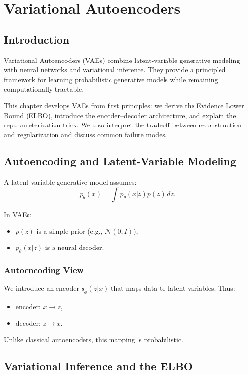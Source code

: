 \chapter{Variational Autoencoders}

\section{Introduction}

Variational Autoencoders (VAEs) combine latent-variable generative modeling with neural networks and variational inference. They provide a principled framework for learning probabilistic generative models while remaining computationally tractable.

This chapter develops VAEs from first principles: we derive the Evidence Lower Bound (ELBO), introduce the encoder--decoder architecture, and explain the reparameterization trick. We also interpret the tradeoff between reconstruction and regularization and discuss common failure modes.

\section{Autoencoding and Latent-Variable Modeling}

A latent-variable generative model assumes:
\[
p_\theta(x) = \int p_\theta(x|z)p(z)\,dz.
\]

In VAEs:
\begin{itemize}
    \item $p(z)$ is a simple prior (e.g., $\mathcal{N}(0,I)$),
    \item $p_\theta(x|z)$ is a neural decoder.
\end{itemize}

\subsection{Autoencoding View}

We introduce an encoder $q_\phi(z|x)$ that maps data to latent variables. Thus:
\begin{itemize}
    \item encoder: $x \to z$,
    \item decoder: $z \to x$.
\end{itemize}

Unlike classical autoencoders, this mapping is probabilistic.

\section{Variational Inference and the ELBO}

